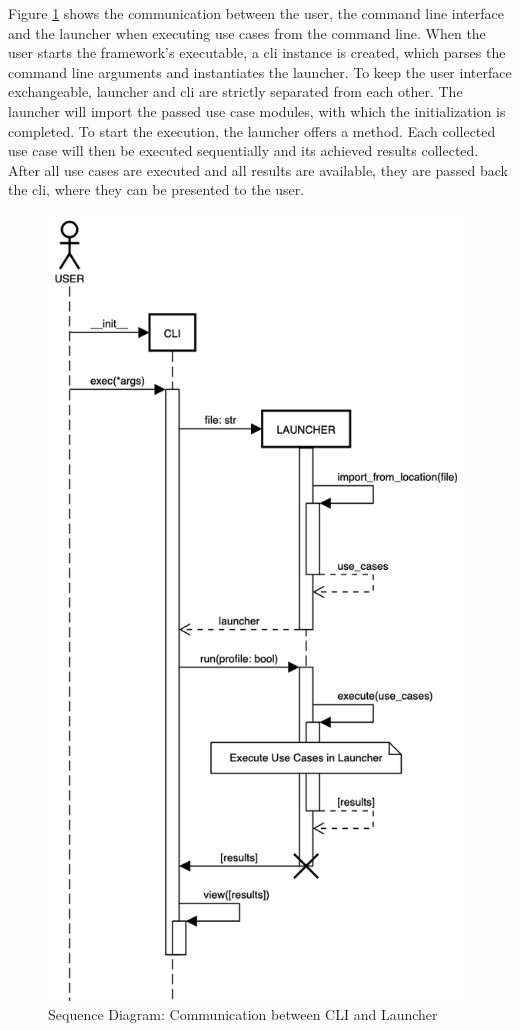 Figure \ref{fig:application:design:cli} shows the communication between the
user, the command line interface and the launcher when executing use cases from
the command line.  When the user starts the framework's executable, a \gls{cli}
instance is created, which parses the command line arguments and instantiates
the launcher. To keep the user interface exchangeable, launcher and \gls{cli}
are strictly separated from each other. The launcher will import the passed use
case modules, with which the initialization is completed. To start the
execution, the launcher offers a  method. Each
collected use case will then be executed sequentially and its achieved results
collected. After all use cases are executed and all results are available, they
are passed back the \gls{cli}, where they can be presented to the user.

\begin{figure}[h]
    \centering
    \includegraphics[width=11cm]{resources/img/sequence/cli}
    \caption{
        Sequence Diagram: Communication between CLI and Launcher 
    }
    \label{fig:application:design:cli}
\end{figure}


